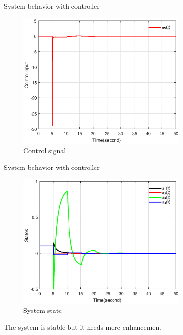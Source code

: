 \documentclass[dvipsnames,mathserif]{beamer}
\begin{document}
{    \begin{frame}
      System behavior with controller

      \begin{figure}[H]
        \centering
        \includegraphics[width=0.75\textwidth]{kuc.eps}
        \caption{Control signal }
        \label{fig3.3}
      \end{figure}
    \end{frame}
    \begin{frame}
      System behavior with controller
      \begin{figure}[H]
        \centering
        \includegraphics[width=0.75\textwidth]{kstates.eps}
        \caption{System state}
        \label{fig3.4}
      \end{figure}

      The system is stable but it needs more enhancement
    \end{frame}


}
\end{document}

